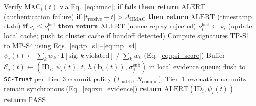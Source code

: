 \documentclass[12pt, a4paper]{report}
\begin{document}
\begin{algorithm}[H]
\caption{Lightweight Rule-Based Beacon Detection (\texttt{LW-DETECT})}
\begin{algorithmic}[1]
  \small
\State Verify $\mathrm{MAC}_i(t)$ via Eq.~\eqref{eq:hmac};
         \textbf{if} fails \textbf{then return}
         $\mathrm{ALERT}$ (authentication failure)
  \State \textbf{if} $|t_{\mathrm{receive}} - t|
         > \Delta_{\mathrm{HMAC}}$
         \textbf{then return} $\mathrm{ALERT}$
         (timestamp stale)
  \State \textbf{if} $\nu_i \leq \nu_i^{\mathrm{last}}$
         \textbf{then return} $\mathrm{ALERT}$
         (nonce replay rejected)
  \State $\nu_i^{\mathrm{last}} \gets \nu_i$ (update local
         cache; push to cluster cache if handoff detected)
  \State Compute signatures TP-S1 to MP-S4
         using Eqs.~\eqref{eq:tp_s1}--\eqref{eq:mp_s4}
  \State $\psi_i(t) \gets \sum_k w_k \cdot \mathbf{1}[\text{sig.}~k~\text{violated}]
         \;/\; \sum_k w_k$ \quad (Eq.~\eqref{eq:psi_score})
       \State Buffer $\mathcal{E}_j(t) \gets (\mathrm{ID}_i,\,
           \psi_i(t),\, t,\, h(\mathbf{b}_i(t)),\,
           \sigma_j^{\mathrm{sub}})$ in local evidence queue;
           flush to \texttt{SC-Trust} per Tier~3 commit policy
           ($T_{\mathrm{batch}}$, $N_{\mathrm{commit}}$);
           Tier~1 revocation commits remain synchronous
           \quad (Eq.~\eqref{eq:rsu_evidence})
    \State \textbf{return} $\mathrm{ALERT}(\mathrm{ID}_i, \psi_i(t))$
  \EndIf
  \State \textbf{return} $\mathrm{PASS}$
  \EndProcedure
\end{algorithmic}
\label{alg:lightweight}
\end{algorithm}
\end{document}
